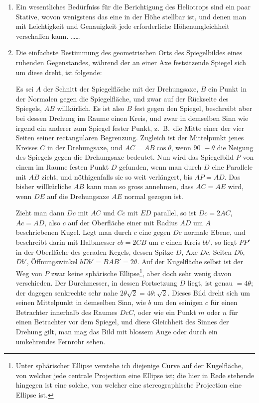 \documentclass[12pt,a4paper]{article}
\theoremstyle{plain}
\theoremstyle{definition}
\theoremstyle{remark}
\begin{document}
\begin{enumerate}[label=\arabic*.]
\item Ein wesentliches Bed\"urfniss f\"ur die Berichtigung des Heliotrops sind ein paar Stative, wovon wenigstens das eine in der H\"ohe stellbar ist, und denen man mit Leichtigkeit und Genauigkeit jede erforderliche H\"ohenungleichheit verschaffen kann. \ldots\ldots

\item Die einfachste Bestimmung des geometrischen Orts des Spiegelbildes eines ruhenden Gegenstandes, w\"ahrend der an einer Axe festsitzende Spiegel sich um diese dreht, ist folgende:

Es sei $A$ der Schnitt der Spiegelfl\"ache mit der Drehungsaxe, $B$ ein Punkt in der Normalen gegen die Spiegelfl\"ache, und zwar auf der R\"uckseite des Spiegels, $AB$ willk\"urlich. Es ist also $B$ fest gegen den Spiegel, beschreibt aber bei dessen Drehung im Raume einen Kreis, und zwar in demselben Sinn wie irgend ein anderer zum Spiegel fester Punkt, z.~B.\ die Mitte einer der vier Seiten seiner rectangularen Begrenzung. Zugleich ist der Mittelpunkt jenes Kreises $C$ in der Drehungsaxe, und $AC = AB\cos\theta$, wenn $90^{\circ} - \theta$ die Neigung des Spiegels gegen die Drehungsaxe bedeutet. Nun wird das Spiegelbild $P$ von einem im Raume festen Punkt $D$ gefunden, wenn man durch $D$ eine Parallele mit $AB$ zieht, und n\"othigenfalls sie so weit verl\"angert, bis $AP = AD$. Das bisher willk\"urliche $AB$ kann man so gross annehmen, dass $AC = AE$ wird, wenn $DE$ auf die Drehungsaxe $AE$ normal gezogen ist.

Zieht man dann $Dc$ mit $AC$ und $Cc$ mit $ED$ parallel, so ist $Dc = 2AC$, $Ac = AD$, also $c$ auf der Oberfl\"ache einer mit Radius $AD$ um $A$ beschriebenen Kugel. Legt man durch $c$ eine gegen $Dc$ normale Ebene, und beschreibt darin mit Halbmesser $cb = 2CB$ um $c$ einen Kreis $bb'$, so liegt $PP'$ in der Oberfl\"ache des geraden Kegels, dessen Spitze $D$, Axe $Dc$, Seiten $Db$, $Db'$, \"Offnungswinkel $bDb' = BAB' = 2\theta$. Auf der Kugelfl\"ache selbst ist der Weg von $P$ zwar keine sph\"arische Ellipse\footnote{Unter sph\"arischer Ellipse verstehe ich diejenige Curve auf der Kugelfl\"ache, von welcher jede centrale Projection eine Ellipse ist; die hier in Rede stehende hingegen ist eine solche, von welcher eine stereographische Projection eine Ellipse ist.}, aber doch sehr wenig davon verschieden. Der Durchmesser, in dessen Fortsetzung $D$ liegt, ist genau $= 4\theta$; der dagegen senkrechte sehr nahe $2\theta\sqrt{2} = 4\theta : \sqrt{2}$. Dieses Bild dreht sich um seinen Mittelpunkt in demselben Sinn, wie $b$ um den seinigen $c$ f\"ur einen Betrachter innerhalb des Raumes $DcC$, oder wie ein Punkt $m$ oder $n$ f\"ur einen Betrachter vor dem Spiegel, und diese Gleichheit des Sinnes der Drehung gilt, man mag das Bild mit blossem Auge oder durch ein umkehrendes Fernrohr sehen.


\end{enumerate}
\end{document}
